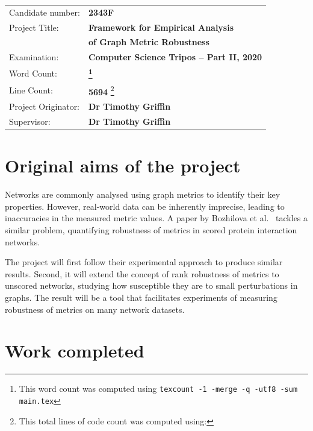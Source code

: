 \documentclass[12pt,a4paper,twoside,openany]{report}
\begin{document}
    {\large
        \begin{savenotes}
            \begin{tabular}{ll}
                Candidate number: & \textbf{2343F}                            \\
                Project Title: & \textbf{Framework for Empirical Analysis} \\ & \textbf{of Graph Metric Robustness}                    \\
                Examination: & \textbf{Computer Science Tripos -- Part II, 2020} \\
                Word Count: & \textbf{\footnote{This word count was computed using \texttt{texcount -1 -merge -q -utf8 -sum main.tex}}}                                    \\
                Line Count: & \textbf{5694} \footnote{This total lines of code count was computed using: } \\
                Project Originator: & \textbf{Dr Timothy Griffin}                               \\
                Supervisor: & \textbf{Dr Timothy Griffin}                                        \\
            \end{tabular}
        \end{savenotes}
    }

    \section*{Original aims of the project}

    Networks are commonly analysed using graph metrics to identify their key properties.
    However, real-world data can be inherently imprecise, leading to inaccuracies in the measured metric values.
    A paper by Bozhilova et al.~\cite{Bozhilova2019} tackles a similar problem, quantifying robustness of metrics in scored protein interaction networks.

    The project will first follow their experimental approach to produce similar results.
    Second, it will extend the concept of rank robustness of metrics to unscored networks, studying how susceptible they are to small perturbations in graphs.
    The result will be a tool that facilitates experiments of measuring robustness of metrics on many network datasets.


    \section*{Work completed}
\end{document}
